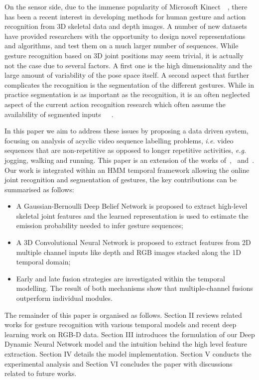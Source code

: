 On the sensor side, due to the immense popularity of Microsoft Kinect~\cite{shotton2011real}~\cite{lingshao2}, there has been a recent interest in developing methods for human gesture and action recognition from 3D skeletal data and depth images.
A number of new datasets~\cite{ICMI,fothergill2012instructing,guyon2012chalearn,wang2012mining} have provided researchers with the opportunity to design novel representations and algorithms, and test them on a much larger number of sequences.
While gesture recognition based on 3D joint positions may seem trivial, it is actually not the case due to several factors. A first one is the high dimensionality and the large amount of variability of the pose space itself.
A second aspect that further complicates the recognition is the segmentation of the different gestures. While in practice segmentation is as important as the recognition, it is an often neglected aspect of the current action recognition research which often assume the availability of segmented inputs~\cite{laptev2005space}~\cite{marszalek09}~\cite{Kuehne11}.

In this paper we aim to address these issues by proposing a data driven system, focusing on analysis of acyclic video sequence labelling problems, \emph{i.e.} video sequences that are non-repetitive as opposed to longer repetitive activities, \textit{e.g.} jogging, walking and running. This paper is an extension of the works of~\cite{diwucvpr14},~\cite{wu2014deep} and~\cite{lio2014deep}.
Our work is integrated within an HMM temporal framework allowing the online joint recognition and segmentation of gestures, the key contributions can be summarised as follows:
\begin{itemize}
\item A Gaussian-Bernoulli Deep Belief Network is proposed to extract high-level skeletal joint features and the learned representation is used to estimate the emission probability needed to infer gesture sequences;
\item A 3D Convolutional Neural Network  is proposed to extract features from 2D multiple channel inputs 
like  depth and RGB images stacked along the 1D temporal domain;
\item Early and late fusion strategies are investigated within the temporal modelling. The result of both mechanisms
show that multiple-channel fusions outperform individual modules.
\end{itemize}

The remainder of this paper is organised as follows. Section II reviews related works for gesture recognition with various temporal models and recent deep learning work on RGB-D data. Section III introduces the formulation of our Deep Dynamic Neural Network model and the intuition behind the high level feature extraction. Section IV details the model implementation. Section V conducts the experimental analysis and Section VI concludes the paper with discussions related to future works.


\endinput
